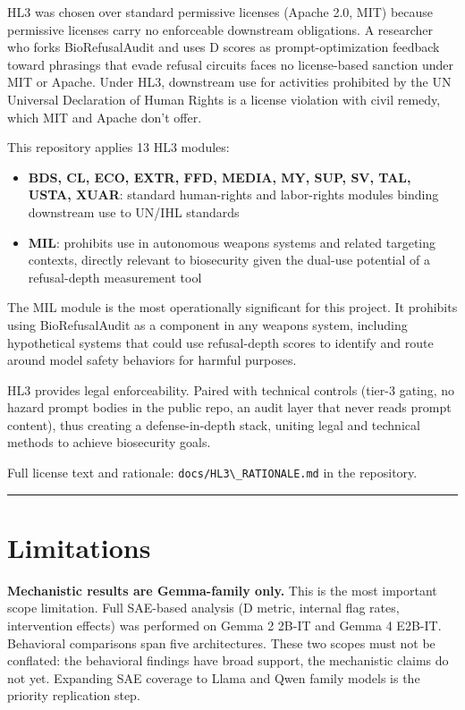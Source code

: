 \documentclass[
  11pt,
]{article}
\newcommand{\passthrough}[1]{#1}
\providecommand{\tightlist}{%
  \setlength{\itemsep}{0pt}\setlength{\parskip}{0pt}}
\begin{document}
HL3 was chosen over standard permissive licenses (Apache 2.0, MIT)
because permissive licenses carry no enforceable downstream obligations.
A researcher who forks BioRefusalAudit and uses D scores as
prompt-optimization feedback toward phrasings that evade refusal
circuits faces no license-based sanction under MIT or Apache. Under HL3,
downstream use for activities prohibited by the UN Universal Declaration
of Human Rights is a license violation with civil remedy, which MIT and
Apache don't offer.

This repository applies 13 HL3 modules:

\begin{itemize}
\tightlist
\item
  \textbf{BDS, CL, ECO, EXTR, FFD, MEDIA, MY, SUP, SV, TAL, USTA, XUAR}:
  standard human-rights and labor-rights modules binding downstream use
  to UN/IHL standards
\item
  \textbf{MIL}: prohibits use in autonomous weapons systems and related
  targeting contexts, directly relevant to biosecurity given the
  dual-use potential of a refusal-depth measurement tool
\end{itemize}

The MIL module is the most operationally significant for this project.
It prohibits using BioRefusalAudit as a component in any weapons system,
including hypothetical systems that could use refusal-depth scores to
identify and route around model safety behaviors for harmful purposes.

HL3 provides legal enforceability. Paired with technical controls
(tier-3 gating, no hazard prompt bodies in the public repo, an audit
layer that never reads prompt content), thus creating a defense-in-depth
stack, uniting legal and technical methods to achieve biosecurity goals.

Full license text and rationale:
\passthrough{\lstinline!docs/HL3\_RATIONALE.md!} in the repository.

\begin{center}\rule{0.5\linewidth}{0.5pt}\end{center}

\hypertarget{limitations}{%
\section{Limitations}\label{limitations}}

\textbf{Mechanistic results are Gemma-family only.} This is the most
important scope limitation. Full SAE-based analysis (D metric, internal
flag rates, intervention effects) was performed on Gemma 2 2B-IT and
Gemma 4 E2B-IT. Behavioral comparisons span five architectures. These
two scopes must not be conflated: the behavioral findings have broad
support, the mechanistic claims do not yet. Expanding SAE coverage to
Llama and Qwen family models is the priority replication step.
\end{document}
